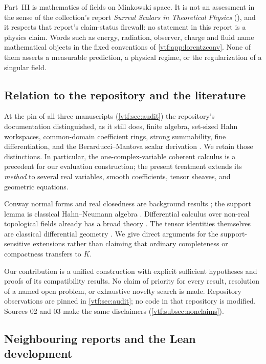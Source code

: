 \documentclass[11pt,letterpaper]{article}
\theoremstyle{definition}
\theoremstyle{remark}
\begin{document}
Part~III is mathematics of fields on Minkowski space. It is not an
assessment in the sense of the collection's report \emph{Surreal Scalars in
Theoretical Physics} (), and it
respects that report's claim-status firewall: no statement in this report is a
physics claim. Words such as energy, radiation, observer, charge and fluid name
mathematical objects in the fixed conventions of \cref{vtf:app:lorentzconv}.
None of them asserts a measurable prediction, a physical regime, or the
regularization of a singular field.

\subsection{Relation to the repository and the literature}

At the pin of all three manuscripts (\cref{vtf:sec:audit}) the repository's
documentation distinguished, as it still does, finite algebra,
set-sized Hahn workspaces, common-domain coefficient rings, strong summability,
fine differentiation, and the Berarducci--Mantova scalar derivation
\cite{Repo,RepoAnalysis,RepoFound}. We retain those distinctions. In particular,
the one-complex-variable coherent calculus is a precedent for our evaluation
construction; the present treatment extends its \emph{method} to several real
variables, smooth coefficients, tensor sheaves, and geometric equations.

Conway normal forms and real closedness are background results
\cite{Gonshor,vdDE,Poonen93}; the support lemma is classical Hahn--Neumann
algebra \cite{Neumann,Poonen26}. Differential calculus over non-real topological
fields already has a broad theory \cite{BGN}. The tensor identities themselves
are classical differential geometry \cite{Lee,Petersen,Warner}. We give direct
arguments for the support-sensitive extensions rather than claiming that
ordinary completeness or compactness transfers to $K$.

Our contribution is a unified construction with explicit sufficient hypotheses
and proofs of its compatibility results. No claim of priority for every
result, resolution of a named open problem, or exhaustive novelty search is
made. Repository observations are pinned in \cref{vtf:sec:audit}; no code in that
repository is modified. Sources 02 and 03 make the same disclaimers
(\cref{vtf:subsec:nonclaims}).

\subsection{Neighbouring reports and the Lean development}\label{vtf:subsec:neighbours}
\end{document}
